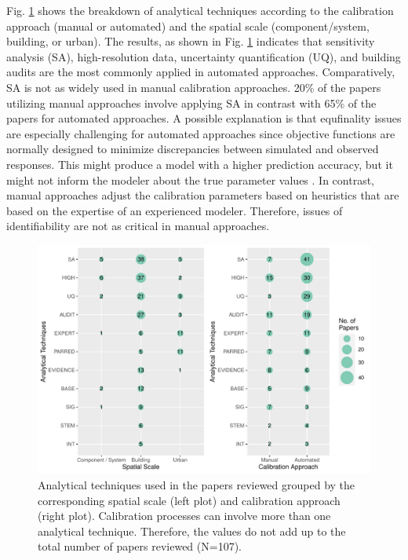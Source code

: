 \documentclass[review]{elsarticle}
\begin{document}
Fig. \ref{fig:analytical_approach} shows the breakdown of analytical techniques according to the calibration approach (manual or automated) and the spatial scale (component/system, building, or urban). The results, as shown in Fig. \ref{fig:analytical_approach} indicates that sensitivity analysis (SA), high-resolution data, uncertainty quantification (UQ), and building audits are the most commonly applied in automated approaches. Comparatively, SA is not as widely used in manual calibration approaches. 20\% of the papers utilizing manual approaches involve applying SA in contrast with 65\% of the papers for automated approaches. A possible explanation is that equfinality issues are especially challenging for automated approaches since objective functions are normally designed to minimize discrepancies between simulated and observed responses. This might produce a model with a higher prediction accuracy, but it might not inform the modeler about the true parameter values \cite{beven2006manifesto}. In contrast, manual approaches adjust the calibration parameters based on heuristics that are based on the expertise of an experienced modeler. Therefore, issues of identifiability are not as critical in manual approaches. 

\begin{figure}[!h]
\centering
\includegraphics[width=\textwidth]{figures/approach_scale.pdf}
\caption{Analytical techniques used in the papers reviewed grouped by the corresponding spatial scale (left plot) and calibration approach (right plot). Calibration processes can involve more than one analytical technique. Therefore, the values do not add up to the total number of papers reviewed (N=107).}
\label{fig:analytical_approach}
\end{figure}
\end{document}
